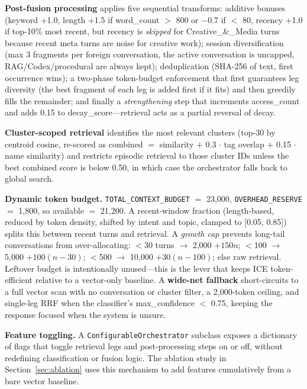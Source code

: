 \documentclass[11pt,a4paper]{article}
\begin{document}
\textbf{Post-fusion processing} applies five sequential transforms: additive bonuses (keyword +1.0, length +1.5 if word\_count $>$ 800 or $-$0.7 if $<$ 80, recency +1.0 if top-10\% most recent, but recency is \emph{skipped} for Creative\_\&\_Media turns because recent meta turns are noise for creative work); session diversification (max 3 fragments per foreign conversation, the active conversation is uncapped, RAG/Codex/procedural are always kept); deduplication (SHA-256 of text, first occurrence wins); a two-phase token-budget enforcement that first guarantees leg diversity (the best fragment of each leg is added first if it fits) and then greedily fills the remainder; and finally a \emph{strengthening} step that increments access\_count and adds 0.15 to decay\_score---retrieval acts as a partial reversal of decay.

\textbf{Cluster-scoped retrieval} identifies the most relevant clusters (top-30 by centroid cosine, re-scored as combined $=$ similarity $+$ 0.3 $\cdot$ tag overlap $+$ 0.15 $\cdot$ name similarity) and restricts episodic retrieval to those cluster IDs unless the best combined score is below 0.50, in which case the orchestrator falls back to global search.

\textbf{Dynamic token budget.} \texttt{TOTAL\_CONTEXT\_BUDGET} $=$ 23{,}000, \texttt{OVERHEAD\_RESERVE} $=$ 1{,}800, so available $=$ 21{,}200. A recent-window fraction (length-based, reduced by token density, shifted by intent and topic, clamped to [0.05, 0.85]) splits this between recent turns and retrieval. A \emph{growth cap} prevents long-tail conversations from over-allocating: $<$30 turns $\to$ 2{,}000 $+ 150n$; $<$100 $\to$ 5{,}000 $+ 100(n-30)$; $<$500 $\to$ 10{,}000 $+ 30(n-100)$; else raw retrieval. Leftover budget is intentionally unused---this is the lever that keeps ICE token-efficient relative to a vector-only baseline. A \textbf{wide-net fallback} short-circuits to a full vector scan with no conversation or cluster filter, a 2{,}000-token ceiling, and single-leg RRF when the classifier's max\_confidence $<$ 0.75, keeping the response focused when the system is unsure.

\textbf{Feature toggling.} A \texttt{ConfigurableOrchestrator} subclass exposes a dictionary of flags that toggle retrieval legs and post-processing steps on or off, without redefining classification or fusion logic. The ablation study in Section~\ref{sec:ablation} uses this mechanism to add features cumulatively from a bare vector baseline.
\end{document}
